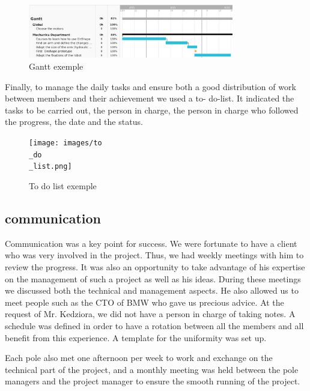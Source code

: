 \begin{figure}[ht]
    \centering
    \includegraphics[width=0.8\textwidth]{images/gantt.png}
    \caption{Gantt exemple}
    \label{fig:mesh5}
\end{figure}
\FloatBarrier

\bigbreak

Finally, to manage the daily tasks and ensure both a good distribution of work between members and their achievement we used a to- do-list. It indicated the tasks to be carried out, the person in charge, the person in charge who followed the progress, the date and the status. 

\begin{figure}[ht]
    \centering
    \texttt{[image: images/to\\\_do\\\_list.png]}
    \caption{To do list exemple}
    \label{fig:mesh6}
\end{figure}

\subsection{communication}

\hspace{\parindent} Communication was a key point for success. We were fortunate to have a client who was very involved in the project. Thus, we had weekly meetings with him to review the progress. It was also an opportunity to take advantage of his expertise on the management of such a project as well as his ideas. During these meetings we discussed both the technical and management aspects. He also allowed us to meet people such as the CTO of BMW who gave us precious advice. At the request of Mr. Kedziora, we did not have a person in charge of taking notes. A schedule was defined in order to have a rotation between all the members and all benefit from this experience. A template for the uniformity was set up. 

\bigbreak

Each pole also met one afternoon per week to work and exchange on the technical part of the project, and a monthly meeting was held between the pole managers and the project manager to ensure the smooth running of the project. 

